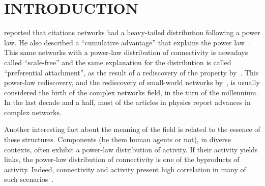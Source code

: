 \documentclass[12pt,fleqn]{article}
\begin{document}
\section{INTRODUCTION}
\cite{price1}
reported that citations networks had a heavy-tailed distribution following a power law.
He also described a ``cumulative advantage'' that explains the power law~\citep{price2}.
This same networks with a power-law distribution of connectivity is nowadays called ``scale-free''
and the same explanation for the distribution is called ``preferential attachment'',
as the result of a rediscovery of the property by~\cite{barabasi1}.
This power-law rediscovery, and the rediscovery of small-world networks by~\cite{small},
is usually considered the birth of the complex networks field,
in the turn of the millennium.
In the last decade and a half,
most of the articles in physics report advances in complex networks.

Another interesting fact about the meaning of the field
is related to the essence of these structures.
Components (be them human agents or not), in diverse contexts, often
exhibit a power-law distribution of activity.
If their activity yields links,
the power-law distribution of connectivity is one of the byproducts of activity.
Indeed, connectivity and activity present high correlation in many of such scenarios~\citep{fabbri1,fabbri2,fabbri3}.
\end{document}
